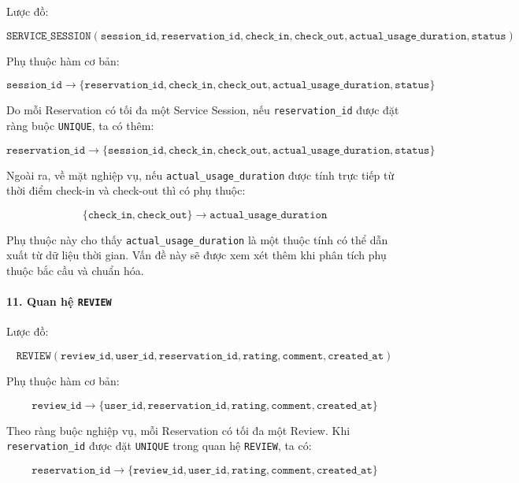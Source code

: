 Lược đồ:

$$
\texttt{SERVICE\_SESSION}(
\texttt{session\_id}, \texttt{reservation\_id}, \texttt{check\_in},
\texttt{check\_out}, \texttt{actual\_usage\_duration}, \texttt{status}
)
$$

Phụ thuộc hàm cơ bản:

$$
\texttt{session\_id}
\rightarrow
\{
\texttt{reservation\_id}, \texttt{check\_in}, \texttt{check\_out},
\texttt{actual\_usage\_duration}, \texttt{status}
\}
$$

Do mỗi Reservation có tối đa một Service Session, nếu \texttt{reservation\_id} được đặt ràng buộc \texttt{UNIQUE}, ta có thêm:

$$
\texttt{reservation\_id}
\rightarrow
\{
\texttt{session\_id}, \texttt{check\_in}, \texttt{check\_out},
\texttt{actual\_usage\_duration}, \texttt{status}
\}
$$

Ngoài ra, về mặt nghiệp vụ, nếu \texttt{actual\_usage\_duration} được tính trực tiếp từ thời điểm check-in và check-out thì có phụ thuộc:

$$
\{
\texttt{check\_in}, \texttt{check\_out}
\}
\rightarrow
\texttt{actual\_usage\_duration}
$$

Phụ thuộc này cho thấy \texttt{actual\_usage\_duration} là một thuộc tính có thể dẫn xuất từ dữ liệu thời gian. Vấn đề này sẽ được xem xét thêm khi phân tích phụ thuộc bắc cầu và chuẩn hóa.

\paragraph{11. Quan hệ \texttt{REVIEW}}\mbox{}\par

Lược đồ:

$$
\texttt{REVIEW}(
\texttt{review\_id}, \texttt{user\_id}, \texttt{reservation\_id},
\texttt{rating}, \texttt{comment}, \texttt{created\_at}
)
$$

Phụ thuộc hàm cơ bản:

$$
\texttt{review\_id}
\rightarrow
\{
\texttt{user\_id}, \texttt{reservation\_id}, \texttt{rating},
\texttt{comment}, \texttt{created\_at}
\}
$$

Theo ràng buộc nghiệp vụ, mỗi Reservation có tối đa một Review. Khi \texttt{reservation\_id} được đặt \texttt{UNIQUE} trong quan hệ \texttt{REVIEW}, ta có:

$$
\texttt{reservation\_id}
\rightarrow
\{
\texttt{review\_id}, \texttt{user\_id}, \texttt{rating},
\texttt{comment}, \texttt{created\_at}
\}
$$

